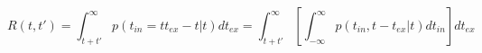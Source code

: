 \begin{equation}
R(t,t') = \int_{t+t'}^\infty p(t_{in}=tt_{ex}-t|t) dt_{ex}  = \int_{t+t'}^\infty \left[ \int_{-\infty}^\infty p(t_{in},t-t_{ex}|t) dt_{in} \right]  dt_{ex}
\end{equation}